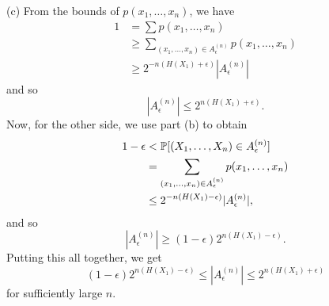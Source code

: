 (c) From the bounds of $p(x_1, \dots, x_n)$, we have
\begin{align*}
    1 &= \sum p(x_1, \dots, x_n) \\
    &\geq \sum_{(x_1, \dots, x_n) \in A_\epsilon^{(n)}} p(x_1, \dots, x_n) \\
    &\geq 2^{-n(H(X_1) + \epsilon)}|A_\epsilon^{(n)}|
\end{align*}
and so 
\[
|A_\epsilon^{(n)}| \leq 2^{n(H(X_1) + \epsilon)}.
\]
Now, for the other side, we use part (b) to obtain
\begin{align*}
    1 - \epsilon &< \P[(X_1, \dots, X_n) \in A_\epsilon^{(n)}] \\
    &= \sum_{(x_1, \dots, x_n) \in A_\epsilon^{(n)}}p(x_1, \dots, x_n) \\
    &\leq 2^{-n(H(X_1) - \epsilon)}|A_\epsilon^{(n)}|,
\end{align*}
and so 
\[
|A_\epsilon^{(n)}| \geq (1 - \epsilon)2^{n(H(X_1) - \epsilon)}.
\]
Putting this all together, we get
\[
(1 - \epsilon)2^{n(H(X_1) - \epsilon)} \leq |A_\epsilon^{(n)}| \leq 2^{n(H(X_1) + \epsilon)}
\]
for sufficiently large $n$.
